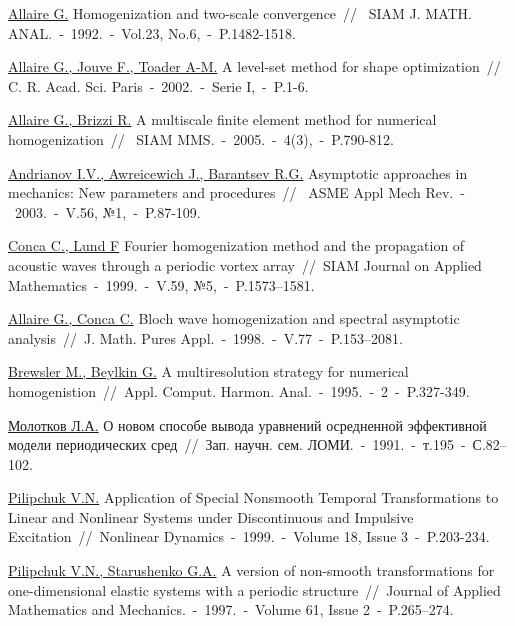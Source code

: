 \documentclass[12pt,a4paper]{article}
\begin{document}
\begin{thebibliography}{00} %
\href{Articles/Allaire 1992.pdf}{Allaire G.} Homogenization and two-scale convergence~//~
SIAM J. MATH. ANAL.~-~1992.~-~Vol.23, No.6,~-~P.1482-1518.

\href{Articles/Allaire 2002.pdf}{Allaire G., Jouve F., Toader A-M.} A level-set method for shape optimization~//~
C. R. Acad. Sci. Paris~-~2002.~-~Serie I,~-~P.1-6.

\href{Articles/Allaire Brizzi 2004.pdf}{Allaire G., Brizzi R.} A multiscale finite element method for numerical homogenization~//~
SIAM MMS.~-~2005.~-~4(3),~-~P.790-812.

\href{Articles/Andrianov Awreicewich Barantsev 2003.pdf}{Andrianov I.V., Awreicewich J., Barantsev R.G.} Asymptotic approaches in mechanics: New parameters and procedures~//~
ASME Appl Mech Rev.~-~2003.~-~V.56, №1,~-~P.87-109.

\href{Articles/Concav Lund 1999.pdf}{Conca C., Lund F} Fourier homogenization method and the propagation of acoustic waves through a periodic vortex array~//~SIAM Journal on Applied Mathematics~-~1999.~-~V.59, №5,~-~P.1573--1581.  

\href{Articles/Allaire Conca 1998.pdf}{Allaire G., Conca C.} Bloch wave homogenization and spectral asymptotic analysis~//~J. Math. Pures Appl.~-~1998.~-~V.77~-~P.153–2081.

\href{Articles/Brewster Beylkin 1995.pdf}{Brewsler M., Beylkin G.} A multiresolution strategy for numerical homogenistion~//~Appl. Comput. Harmon. Anal.~-~1995.~-~2~-~P.327-349.

\href{Articles/Russian/Molotkov 1991.pdf}{Молотков Л.А.} О новом способе вывода уравнений осредненной эффективной модели периодических сред~//~Зап. научн. сем. ЛОМИ.~-~1991.~-~т.195~-~С.82–102.

\href{Articles/Pilipchuk 1999.pdf}{Pilipchuk V.N.} Application of Special Nonsmooth Temporal Transformations to Linear and Nonlinear Systems under Discontinuous and Impulsive Excitation~//~Nonlinear Dynamics~-~1999.~-~Volume 18, Issue 3~-~P.203-234.

\href{Articles/Pilipchuk Starushenko 1997.pdf}{Pilipchuk V.N., Starushenko G.A.} A version of non-smooth transformations for one-dimensional elastic systems with a periodic structure~//~Journal of Applied Mathematics and Mechanics.~-~1997.~-~Volume 61, Issue 2~-~P.265–274.


\end{thebibliography}
\end{document}
